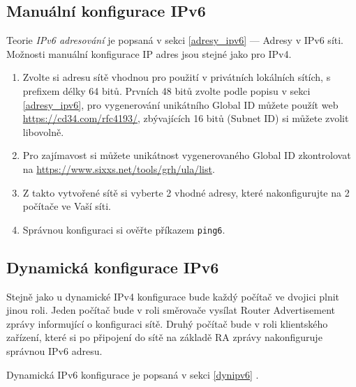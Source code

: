 \subsection{Manuální konfigurace IPv6}
Teorie \emph{IPv6 adresování} je popsaná v sekci \ref{adresy_ipv6} --- Adresy v IPv6 síti.
Možnosti manuální konfigurace IP adres jsou stejné jako pro IPv4.

\begin{enumerate}
    \item Zvolte si adresu sítě vhodnou pro použití v privátních lokálních
        sítích, s prefixem délky 64 bitů. Prvních 48 bitů zvolte podle popisu v
        sekci \ref{adresy_ipv6}, pro vygenerování unikátního Global ID můžete
        použít web \url{https://cd34.com/rfc4193/}, zbývajících 16 bitů (Subnet
        ID) si můžete zvolit libovolně.
    \item Pro zajímavost si můžete unikátnost vygenerovaného Global ID
        zkontrolovat na \url{https://www.sixxs.net/tools/grh/ula/list}.
    \item Z takto vytvořené sítě si vyberte 2 vhodné adresy, které
        nakonfigurujte na 2 počítače ve Vaší síti.
    \item Správnou konfiguraci si ověřte příkazem {\tt ping6}.
\end{enumerate}

\subsection{Dynamická konfigurace IPv6}
Stejně jako u dynamické IPv4 konfigurace bude každý počítač ve dvojici plnit
jinou roli. Jeden počítač bude v roli směrovače vysílat Router Advertisement
zprávy informující o konfiguraci sítě. Druhý počítač bude v roli klientského
zařízení, které si po připojení do sítě na základě RA zprávy nakonfiguruje
správnou IPv6 adresu.

Dynamická IPv6 konfigurace je popsaná v sekci \ref{dynipv6} .

